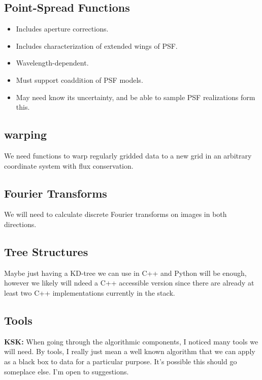 \subsection{Point-Spread Functions}
\label{sec:spPSF}

\begin{itemize}
\item Includes aperture corrections.
\item Includes characterization of extended wings of PSF.
\item Wavelength-dependent.
\item Must support coaddition of PSF models.
\item May need know its uncertainty, and be able to sample PSF realizations form this.
\end{itemize}

\subsection{warping}
\label{sec:spWarp}

We need functions to warp regularly gridded data to a new grid in an arbitrary coordinate system with flux conservation.

\subsection{Fourier Transforms}
\label{sec:spFourier}

We will need to calculate discrete Fourier transforms on images in both directions.

\subsection{Tree Structures}
\label{sec:spTrees}
Maybe just having a KD-tree we can use in C++ and Python will be enough, however we likely will ndeed a C++ accessible version since there are already at least two C++ implementations currently in the stack.

\subsection{Tools}
\label{sec:spTools}

{\bf KSK:} When going through the algorithmic components, I noticed many tools we will need.  By tools, I really just mean a well known algorithm that we can apply as a black box to data for a particular purpose. It's possible this should go someplace else.  I'm open to suggestions.

